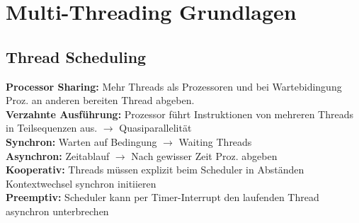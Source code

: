 
\section{Multi-Threading Grundlagen}
\subsection{Thread Scheduling}
\textcolor{b}{\textbf{Processor Sharing:}} Mehr Threads als Prozessoren und bei Wartebidingung Proz. an anderen bereiten Thread abgeben.\\
\textcolor{b}{\textbf{Verzahnte Ausführung:}} Prozessor führt Instruktionen von mehreren Threads in Teilsequenzen aus. $\rightarrow$ Quasiparallelität\\
\textcolor{b}{\textbf{Synchron:}} Warten auf Bedingung $\rightarrow$ Waiting Threads\\
\textcolor{b}{\textbf{Asynchron:}} Zeitablauf $\rightarrow$ Nach gewisser Zeit Proz. abgeben\\
\textcolor{b}{\textbf{Kooperativ:}} Threads müssen explizit beim Scheduler in Abständen Kontextwechsel synchron initiieren\\
\textcolor{b}{\textbf{Preemptiv:}} Scheduler kann per Timer-Interrupt den laufenden Thread asynchron unterbrechen

